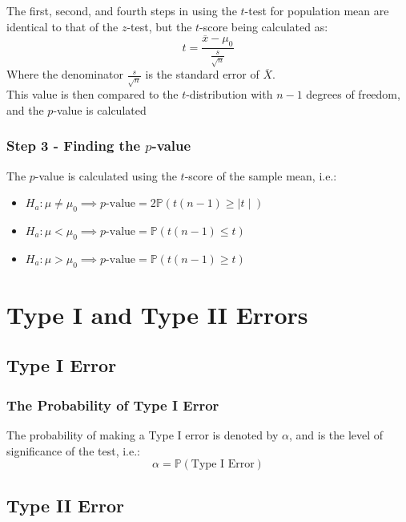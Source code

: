 \documentclass[12pt letter]{report}
\begin{document}
The first, second, and fourth steps in using the $t$-test for population mean are identical to that of the $z$-test, but the
$t$-score being calculated as:
\[
  t = \frac{\overline{x} - \mu_0}{\frac{s}{\sqrt{n}}}
\]
Where the denominator $\frac{s}{\sqrt{n}}$ is the standard error of $\overline{X}$. \\
This value is then compared to the $t$-distribution with $n-1$ degrees of freedom, and the $p$-value is calculated

\subsubsection{Step 3 - Finding the $p$-value}

The $p$-value is calculated using the $t$-score of the sample mean, i.e.:
\begin{itemize}
  \item $H_a: \mu \neq  \mu_0 \implies p\text{-value} = 2 \mathbb{P}\left( t \left( n - 1 \right) \geq  \mid t \mid   \right) $
  \item $H_a: \mu < \mu_0 \implies p\text{-value} = \mathbb{P}\left( t \left( n - 1 \right) \leq t  \right) $
  \item $H_a: \mu > \mu_0 \implies p\text{-value} = \mathbb{P}\left( t \left( n - 1 \right) \geq t  \right) $
\end{itemize}

\section{Type I and Type II Errors}

\subsection{Type I Error}

\subsubsection{The Probability of Type I Error}

The probability of making a Type I error is denoted by $\alpha $, and is the level of significance of the test, i.e.:
\[
  \alpha = \mathbb{P}\left( \text{Type I Error} \right)
\]

\subsection{Type II Error}
\end{document}
